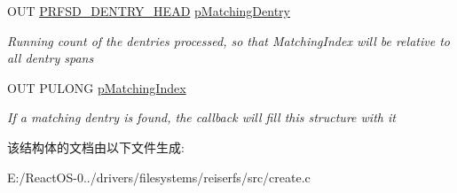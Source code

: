 \begin{DoxyCompactItemize}
O\+UT \hyperlink{structreiserfs__de__head}{P\+R\+F\+S\+D\+\_\+\+D\+E\+N\+T\+R\+Y\+\_\+\+H\+E\+AD} \hyperlink{struct___r_f_s_d___s_c_a_n_d_i_r___c_a_l_l_b_a_c_k___c_o_n_t_e_x_t_a255416463b132cad7be4fc2b5b33acb1}{p\+Matching\+Dentry}
\begin{DoxyCompactList}\small\item\em Running count of the dentries processed, so that Matching\+Index will be relative to all dentry spans \end{DoxyCompactList}\item 
\mbox{\label{struct___r_f_s_d___s_c_a_n_d_i_r___c_a_l_l_b_a_c_k___c_o_n_t_e_x_t_a91b9ffc9bd8a299293d8ba39e473ed4f}} 
O\+UT P\+U\+L\+O\+NG \hyperlink{struct___r_f_s_d___s_c_a_n_d_i_r___c_a_l_l_b_a_c_k___c_o_n_t_e_x_t_a91b9ffc9bd8a299293d8ba39e473ed4f}{p\+Matching\+Index}
\begin{DoxyCompactList}\small\item\em If a matching dentry is found, the callback will fill this structure with it \end{DoxyCompactList}\end{DoxyCompactItemize}


该结构体的文档由以下文件生成\+:\begin{DoxyCompactItemize}
\item 
E\+:/\+React\+O\+S-\/0../drivers/filesystems/reiserfs/src/create.\+c\end{DoxyCompactItemize}
